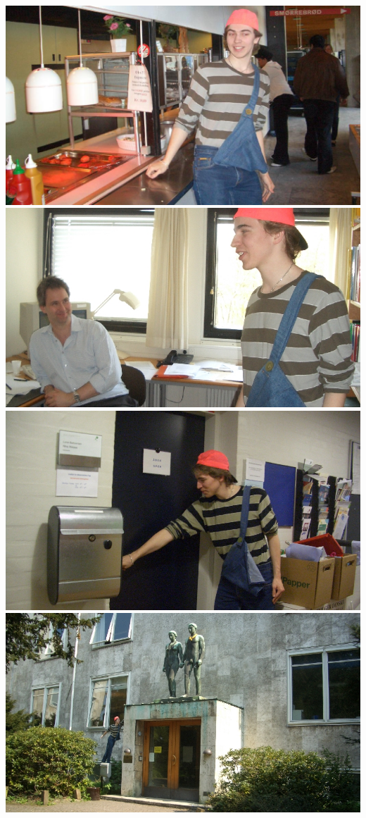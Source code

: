 \newpage
\includegraphics[width=\textwidth]{kantinen.jpg}
\newpage
\includegraphics[width=\textwidth]{kontor.jpg}
\newpage
\includegraphics[width=\textwidth]{sekretariat.jpg}
\newpage
\includegraphics[width=\textwidth]{diku.jpg}
\newpage
\addtolength{\textwidth}{-20mm}
\addtolength{\textheight}{-50mm}
\addtolength{\hoffset}{12mm}
\addtolength{\voffset}{10mm}
